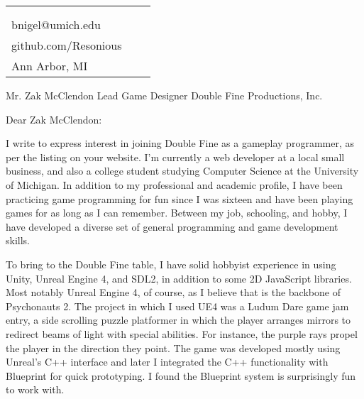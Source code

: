 \documentclass[12pt]{article}
\makeatletter
\def \address{2287 S. Main St.\\Ann Arbor, MI}
\def \author{Nigel Baillie}
\def \email{bnigel@umich.edu}
\def \phonenumber{(734) 678-5328}
\def \github{github.com/Resonious}
\makeatother
\begin{document}
\newlength{\rcollength}\setlength{\rcollength}{3.0in}%
\begin{tabular} {
  p{}
  p{}
  p{}
}
  \begin{flushleft}
    {\Huge{\author}}\\
    \vspace{1.5 mm}
  \end{flushleft}
  &
  \begin{center}
    {\phonenumber}\\
    {\email}\\
    {\github}
  \end{center}
  &
  \begin{flushright}
    {\address}
  \end{flushright}
\end{tabular}

Mr. Zak McClendon
\newline
Lead Game Designer
\newline
Double Fine Productions, Inc.
\newline

Dear Zak McClendon:
\newline

I write to express interest in joining Double Fine as a gameplay programmer,
as per the listing on your website.
I'm currently a web developer at a local small business, and also a college
student studying Computer Science at the University of Michigan. In addition
to my professional and academic profile, I have been practicing game programming
for fun since I was sixteen and have been playing games for as long as I can
remember. Between my job, schooling, and hobby, I have developed a diverse
set of general programming and game development skills.
\newline

To bring to the Double Fine table, I have solid hobbyist experience in using Unity,
Unreal Engine 4, and SDL2, in addition to some 2D JavaScript libraries.
Most notably Unreal Engine 4, of course, as I believe that is the backbone of
Psychonauts 2. The project in which I used UE4 was a Ludum Dare game jam
entry, a side scrolling puzzle platformer in which the player arranges
mirrors to redirect beams of light with special abilities. For instance,
the purple rays propel the player in the direction they point. The game
was developed mostly using Unreal's C++ interface and later I integrated
the C++ functionality with Blueprint for quick prototyping. I found the Blueprint
system is surprisingly fun to work with.
\newline
\end{document}
